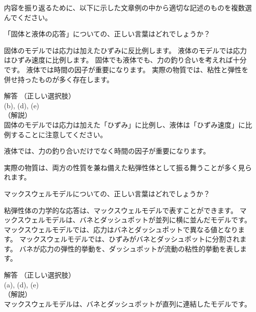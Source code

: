 \documentclass[uplatex,dvipdfmx,a4paper,11pt]{jsarticle}
\begin{document}
内容を振り返るために、以下に示した文章例の中から適切な記述のものを複数選んでください。
\begin{qlist}
	\qitem 「固体と液体の応答」についての、正しい言葉はどれでしょうか？
		\begin{qlist2}
			\qitem 固体のモデルでは応力は加えたひずみに反比例します。
			\qitem 液体のモデルでは応力はひずみ速度に比例します。
			\qitem 固体でも液体でも、力の釣り合いを考えれば十分です。
			\qitem 液体では時間の因子が重要になります。
			\qitem 実際の物質では、粘性と弾性を併せ持ったものが多く存在します。
		\end{qlist2}
		\vspace{3mm}
        \begin{itembox}[l]{解答}
            （正しい選択肢）\\
            (b), (d), (e)\\
            （解説）\\
            固体のモデルでは応力は加えた「ひずみ」に比例し、液体は「ひずみ速度」に比例することに注意してください。

			液体では、力の釣り合いだけでなく時間の因子が重要になります。

			実際の物質は、両方の性質を兼ね備えた粘弾性体として振る舞うことが多く見られます。    
        \end{itembox}
	\qitem マックスウェルモデルについての、正しい言葉はどれでしょうか？
		\begin{qlist2}
			\qitem 粘弾性体の力学的な応答は、マックスウェルモデルで表すことができます。
			\qitem マックスウェルモデルは、バネとダッシュポットが並列に横に並んだモデルです。
			\qitem マックスウェルモデルでは、応力はバネとダッシュポットで異なる値となります。
			\qitem マックスウェルモデルでは、ひずみがバネとダッシュポットに分割されます。
			\qitem バネが応力の弾性的挙動を、ダッシュポットが流動の粘性的挙動を表します。
		\end{qlist2}
		\vspace{3mm}
        \begin{itembox}[l]{解答}
            （正しい選択肢）\\
            (a), (d), (e)\\
            （解説）\\
            マックスウェルモデルは、バネとダッシュポットが直列に連結したモデルです。


\end{itembox}
\end{qlist}
\end{document}
